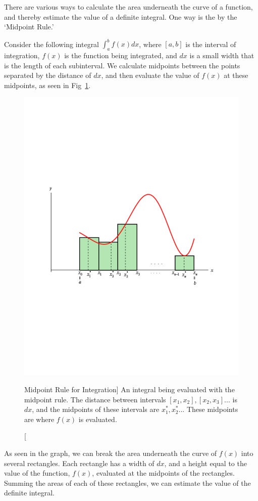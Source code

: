 \documentclass[12pt]{article} %
\begin{document}
There are various ways to calculate the area underneath the curve of a function, and thereby estimate the value of a definite integral. One way is the by the `Midpoint Rule.'



Consider the following integral $\int_{a}^{b} f(x) dx$, where $[a,b]$ is the interval of integration, $f(x)$ is the function being integrated, and $dx$ is a small width that is the length of each subinterval. We calculate  midpoints between the points separated by the distance of $dx$, and then evaluate the value of $f(x)$ at these midpoints, as seen in Fig~\ref{fig:integral}. 

\begin{figure}[H]
	\begin{center}
		\includegraphics[width=0.7\linewidth]{integral}
		\caption
		[Midpoint Rule for Integration]
		{An integral being evaluated with the midpoint rule. The distance between intervals $[x_1, x_2], [x_2, x_3]...$ is $dx$, and the midpoints of these intervals are $x_1^*, x_2^*...$ These midpoints are where $f(x)$ is evaluated.}
		\label{fig:integral}
	\end{center}
\end{figure}

As seen in the graph, we can break the area underneath the curve of $f(x)$ into several rectangles.  Each rectangle has a width of $dx$, and a height equal to the value of the function, $f(x)$, evaluated at the midpoints of the rectangles. Summing the areas of each of these rectangles, we can estimate the value of the definite integral.\\
\end{document}
